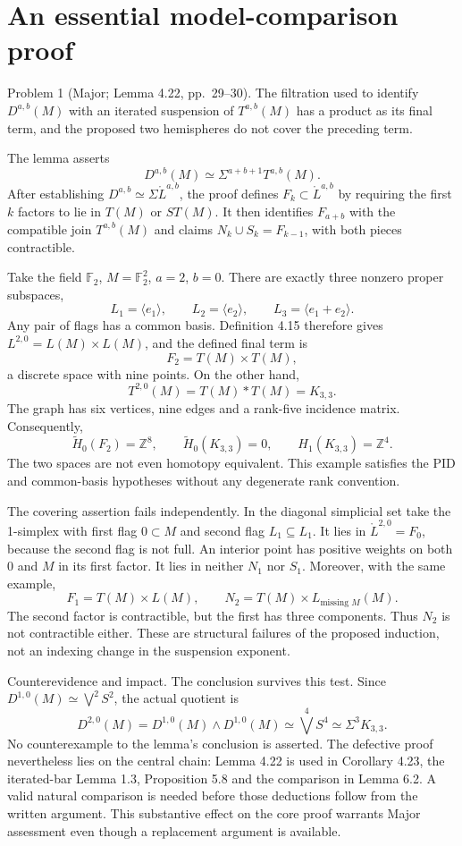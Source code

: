 \documentclass[10pt]{article}
\begin{document}
\section*{An essential model-comparison proof}
Problem 1 (Major; Lemma 4.22, pp. 29–30).  The filtration used to identify \(D^{a,b}(M)\) with an iterated suspension of \(T^{a,b}(M)\) has a product as its final term, and the proposed two hemispheres do not cover the preceding term.\par
The lemma asserts \[D^{a,b}(M)\simeq \Sigma^{a+b+1}T^{a,b}(M).\] After establishing \(D^{a,b}\simeq\Sigma\mathring L^{a,b}\), the proof defines \(F_k\subset\mathring L^{a,b}\) by requiring the first \(k\) factors to lie in \(T(M)\) or \(ST(M)\). It then identifies \(F_{a+b}\) with the compatible join \(T^{a,b}(M)\) and claims \(N_k\cup S_k=F_{k-1}\), with both pieces contractible.\par
Take the field \(\mathbb F_2\), \(M=\mathbb F_2^2\), \(a=2\), \(b=0\). There are exactly three nonzero proper subspaces, \[L_1=\langle e_1\rangle,\qquad L_2=\langle e_2\rangle,
 \qquad L_3=\langle e_1+e_2\rangle.\] Any pair of flags has a common basis. Definition 4.15 therefore gives \(L^{2,0}=L(M)\times L(M)\), and the defined final term is \[F_2=T(M)\times T(M),\] a discrete space with nine points. On the other hand, \[T^{2,0}(M)=T(M)*T(M)=K_{3,3}.\] The graph has six vertices, nine edges and a rank-five incidence matrix. Consequently, \[\widetilde H_0(F_2)=\mathbb Z^8,\qquad
 \widetilde H_0(K_{3,3})=0,\qquad H_1(K_{3,3})=\mathbb Z^4.\] The two spaces are not even homotopy equivalent. This example satisfies the PID and common-basis hypotheses without any degenerate rank convention.\par
The covering assertion fails independently. In the diagonal simplicial set take the 1-simplex with first flag \(0\subset M\) and second flag \(L_1\subseteq L_1\). It lies in \(\mathring L^{2,0}=F_0\), because the second flag is not full. An interior point has positive weights on both \(0\) and \(M\) in its first factor. It lies in neither \(N_1\) nor \(S_1\). Moreover, with the same example, \[F_1=T(M)\times L(M),\qquad
 N_2=T(M)\times L_{\text{missing }M}(M).\] The second factor is contractible, but the first has three components. Thus \(N_2\) is not contractible either. These are structural failures of the proposed induction, not an indexing change in the suspension exponent.\par
Counterevidence and impact. The conclusion survives this test. Since \(D^{1,0}(M)\simeq\bigvee^2S^2\), the actual quotient is \[D^{2,0}(M)=D^{1,0}(M)\wedge D^{1,0}(M)
 \simeq\bigvee^4S^4
 \simeq\Sigma^3K_{3,3}.\] No counterexample to the lemma’s conclusion is asserted. The defective proof nevertheless lies on the central chain: Lemma 4.22 is used in Corollary 4.23, the iterated-bar Lemma 1.3, Proposition 5.8 and the comparison in Lemma 6.2. A valid natural comparison is needed before those deductions follow from the written argument. This substantive effect on the core proof warrants Major assessment even though a replacement argument is available.\par
\end{document}

